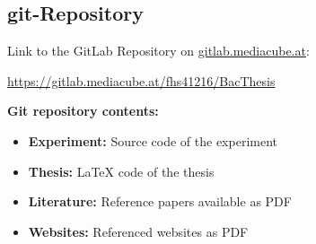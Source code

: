 \begin{appendices}

\section{git-Repository}



Link to the GitLab Repository on {\url{gitlab.mediacube.at}}:

{\color{red}\url{https://gitlab.mediacube.at/fhs41216/BacThesis}}

\textbf{Git repository contents:}

\begin{itemize}
	\item \textbf{Experiment:} Source code of the experiment
	\item \textbf{Thesis:} LaTeX code of the thesis
	\item \textbf{Literature:} Reference papers available as PDF
	\item \textbf{Websites:} Referenced websites as PDF
\end{itemize}








\end{appendices}
